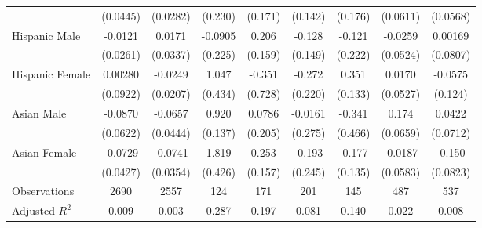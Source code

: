\begin{sidewaystable}
{\begin{longtable}{l*{8}{c}}
                    &    (0.0445)         &    (0.0282)         &     (0.230)         &     (0.171)         &     (0.142)         &     (0.176)         &    (0.0611)         &    (0.0568)         \\
[1em]
Hispanic Male       &     -0.0121         &      0.0171         &     -0.0905         &       0.206         &      -0.128         &      -0.121         &     -0.0259         &     0.00169         \\
                    &    (0.0261)         &    (0.0337)         &     (0.225)         &     (0.159)         &     (0.149)         &     (0.222)         &    (0.0524)         &    (0.0807)         \\
[1em]
Hispanic Female     &     0.00280         &     -0.0249         &       1.047\sym{*}  &      -0.351         &      -0.272         &       0.351\sym{*}  &      0.0170         &     -0.0575         \\
                    &    (0.0922)         &    (0.0207)         &     (0.434)         &     (0.728)         &     (0.220)         &     (0.133)         &    (0.0527)         &     (0.124)         \\
[1em]
Asian Male          &     -0.0870         &     -0.0657         &       0.920\sym{***}&      0.0786         &     -0.0161         &      -0.341         &       0.174\sym{*}  &      0.0422         \\
                    &    (0.0622)         &    (0.0444)         &     (0.137)         &     (0.205)         &     (0.275)         &     (0.466)         &    (0.0659)         &    (0.0712)         \\
[1em]
Asian Female        &     -0.0729         &     -0.0741\sym{*}  &       1.819\sym{***}&       0.253         &      -0.193         &      -0.177         &     -0.0187         &      -0.150         \\
                    &    (0.0427)         &    (0.0354)         &     (0.426)         &     (0.157)         &     (0.245)         &     (0.135)         &    (0.0583)         &    (0.0823)         \\
\hline
Observations        &        2690         &        2557         &         124         &         171         &         201         &         145         &         487         &         537         \\
Adjusted \(R^{2}\)  &       0.009         &       0.003         &       0.287         &       0.197         &       0.081         &       0.140         &       0.022         &       0.008         \\

\end{longtable}}
\end{sidewaystable}
